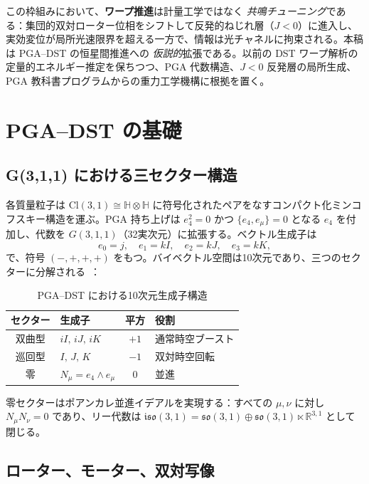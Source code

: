 \documentclass[dvipdfmx,a4paper]{article}
\theoremstyle{definition}
\begin{document}
この枠組みにおいて、\textbf{ワープ推進}は計量工学ではなく \emph{共鳴チューニング}である：集団的双対ローター位相をシフトして反発的ねじれ層（$J<0$）に進入し、実効変位が局所光速限界を超える一方で、情報は光チャネルに拘束される。本稿は PGA--DST の恒星間推進への \emph{仮説的}拡張である。以前の DST ワープ解析の定量的エネルギー推定を保ちつつ、PGA 代数構造、$J<0$ 反発層の局所生成、PGA 教科書プログラムからの重力工学機構に根拠を置く。

\section{PGA--DST の基礎}
\label{sec:foundations}

\subsection{G(3,1,1) における三セクター構造}

各質量粒子は $\mathrm{Cl}(3,1)\cong\mathbb{H}\otimes\mathbb{H}$ に符号化されたペアをなすコンパクト化ミンコフスキー構造を運ぶ。PGA 持ち上げは $e_4^2=0$ かつ $\{e_4,e_\mu\}=0$ となる $e_4$ を付加し、代数を $G(3,1,1)$（32実次元）に拡張する。ベクトル生成子は
\[
e_0=j,\quad e_1=kI,\quad e_2=kJ,\quad e_3=kK,
\]
で、符号 $(-,+,+,+)$ をもつ。バイベクトル空間は10次元であり、三つのセクターに分解される~\cite{pga2025}：

\begin{table}[ht]
\centering
\caption{PGA--DST における10次元生成子構造}
\label{tab:generators}
\begin{tabular}{@{}clcl@{}}
\toprule
セクター & 生成子 & 平方 & 役割 \\
\midrule
双曲型 & $iI,\, iJ,\, iK$ & $+1$ & 通常時空ブースト \\
巡回型 & $I,\, J,\, K$ & $-1$ & 双対時空回転 \\
零 & $N_\mu=e_4\wedge e_\mu$ & $0$ & 並進 \\
\bottomrule
\end{tabular}
\end{table}

零セクターはポアンカレ並進イデアルを実現する：すべての $\mu,\nu$ に対し $N_\mu N_\nu=0$ であり、リー代数は $\mathfrak{iso}(3,1)=\mathfrak{so}(3,1)\oplus\mathfrak{so}(3,1)\ltimes\mathbb{R}^{3,1}$ として閉じる。

\subsection{ローター、モーター、双対写像}
\end{document}
